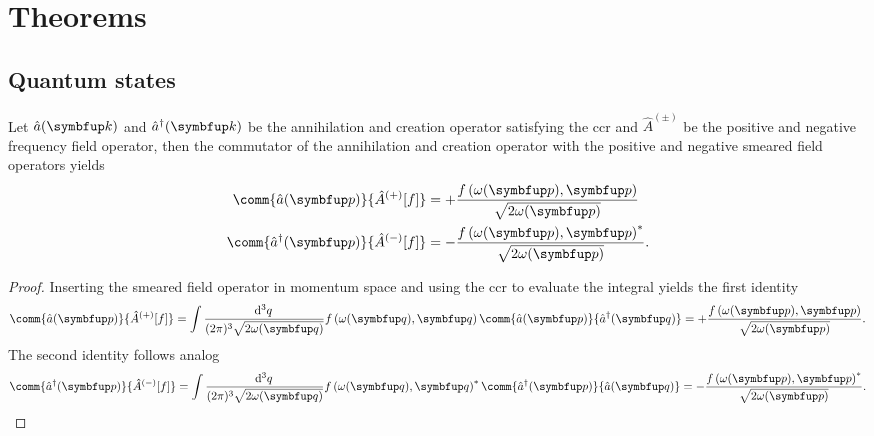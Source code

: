 \chapter{Theorems}

\section{Quantum states}

\begin{lemma}\label{th:annihilation_field_commutators}
	Let $\hat{a}(\vb{k})$ and $\hat{a}^\dagger(\vb{k})$ be the annihilation and creation operator satisfying the \gls{ccr} and $\hat{A}^{(\pm)}$ be the positive and negative frequency field operator, then the commutator of the annihilation and creation operator with the positive and negative smeared field operators yields
	\begin{align}
		\comm{\hat{a}(\vb{p})}{\hat{A}^{(+)}[f]}
		&=
		+\frac{f\left(\omega(\vb{p}),\vb{p}\right)}{\sqrt{2\omega(\vb{p})}}
		\\
		\comm{\hat{a}^\dagger(\vb{p})}{\hat{A}^{(-)}[f]}
		&=
		-\frac{f\left(\omega(\vb{p}),\vb{p}\right)^*}{\sqrt{2\omega(\vb{p})}}
		.
	\end{align}
\end{lemma}
\begin{proof}
	Inserting the smeared field operator in momentum space and using the \gls{ccr} to evaluate the integral yields the first identity
	\begin{equation}
		\comm{\hat{a}(\vb{p})}{\hat{A}^{(+)}[f]}
		=
		\int\frac{\dd[3]{q}}{(2\pi)^3\sqrt{2\omega(\vb{q})}}
		f\left(\omega(\vb{q}),\vb{q}\right)
		\comm{\hat{a}(\vb{p})}{\hat{a}^\dagger(\vb{q})}
		=
		+\frac{f\left(\omega(\vb{p}),\vb{p}\right)}{\sqrt{2\omega(\vb{p})}}
		.
	\end{equation}
	The second identity follows analog
	\begin{equation}
		\comm{\hat{a}^\dagger(\vb{p})}{\hat{A}^{(-)}[f]}
		=
		\int\frac{\dd[3]{q}}{(2\pi)^3\sqrt{2\omega(\vb{q})}}
		f\left(\omega(\vb{q}),\vb{q}\right)^*
		\comm{\hat{a}^\dagger(\vb{p})}{\hat{a}(\vb{q})}
		=
		-\frac{f\left(\omega(\vb{p}),\vb{p}\right)^*}{\sqrt{2\omega(\vb{p})}}
		.
	\end{equation}
\end{proof}

